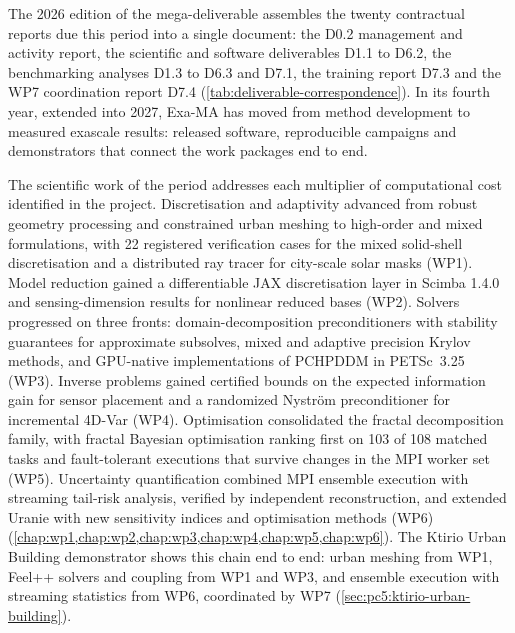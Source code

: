 \label{sec:conclusions}

The 2026 edition of the mega-deliverable assembles the twenty
contractual reports due this period into a single document: the D0.2
management and activity report, the scientific and software
deliverables D1.1 to D6.2, the benchmarking analyses D1.3 to D6.3 and
D7.1, the training report D7.3 and the WP7 coordination report D7.4
(\cref{tab:deliverable-correspondence}). In its fourth year, extended
into 2027, Exa-MA has moved from method development to measured
exascale results: released software, reproducible campaigns and
demonstrators that connect the work packages end to end.

The scientific work of the period addresses each multiplier of
computational cost identified in the project. Discretisation and
adaptivity advanced from robust geometry processing and constrained
urban meshing to high-order and mixed formulations, with 22
registered verification cases for the mixed solid-shell
discretisation and a distributed ray tracer for city-scale solar
masks (WP1). Model reduction gained a differentiable JAX
discretisation layer in Scimba 1.4.0 and sensing-dimension results
for nonlinear reduced bases (WP2). Solvers progressed on three
fronts: domain-decomposition preconditioners with stability
guarantees for approximate subsolves, mixed and adaptive precision
Krylov methods, and GPU-native implementations of PCHPDDM in
PETSc~3.25 (WP3). Inverse problems gained certified bounds on the
expected information gain for sensor placement and a randomized
Nyström preconditioner for incremental 4D-Var (WP4). Optimisation
consolidated the fractal decomposition family, with fractal Bayesian
optimisation ranking first on 103 of 108 matched tasks and
fault-tolerant executions that survive changes in the MPI worker set
(WP5). Uncertainty quantification combined MPI ensemble execution
with streaming tail-risk analysis, verified by independent
reconstruction, and extended Uranie with new sensitivity indices and
optimisation methods (WP6)
(\cref{chap:wp1,chap:wp2,chap:wp3,chap:wp4,chap:wp5,chap:wp6}).
The Ktirio Urban Building demonstrator shows this chain end to end:
urban meshing from WP1, Feel++ solvers and coupling from WP1 and
WP3, and ensemble execution with streaming statistics from WP6,
coordinated by WP7 (\cref{sec:pc5:ktirio-urban-building}).


